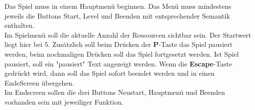 Das Spiel \gameTitle muss in einem Hauptmenü beginnen. Das Menü muss mindestens jeweils die Buttons \glqq Start\grqq{}, \glqq Level\grqq{} und \glqq Beenden\grqq{} mit entsprechender Semantik enthalten. \\
Im Spielmen\"u soll die aktuelle Anzahl der Ressourcen sichtbar sein. Der Startwert liegt hier bei 5.
Zusätzlich soll beim Drücken der \textbf{P}-Taste das Spiel pausiert werden,	beim nochmaligen Drücken soll das Spiel fortgesetzt werden.
Ist Spiel pausiert, soll ein "pausiert" Text angezeigt werden.
Wenn die \textbf{Escape}-Taste gedrückt wird, dann soll das Spiel sofort beendet werden und in einen EndeScreen übergehen.\\
Im Endscreen sollen die drei Buttons \glqq Neustart\grqq{}, \glqq Hauptmen\"u\grqq{} und \glqq Beenden\grqq{} vorhanden sein mit jeweiliger Funktion. 
